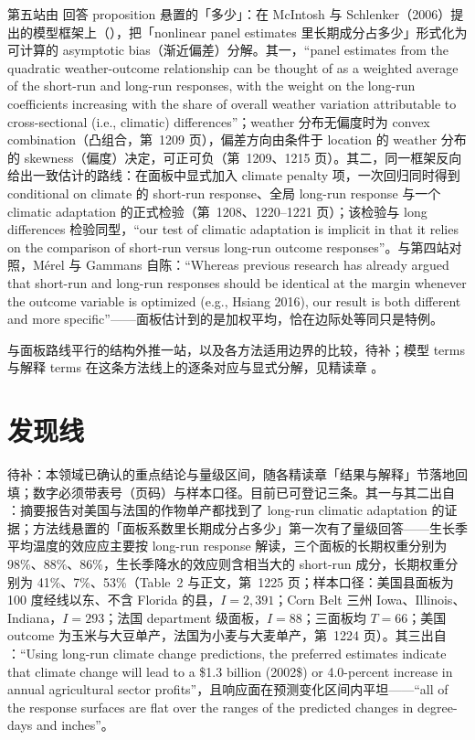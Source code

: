 第五站由  回答 proposition 悬置的「多少」：在 McIntosh 与 Schlenker（2006）提出的模型框架上（\citealp{mcintosh2006identifying}），把「nonlinear panel estimates 里长期成分占多少」形式化为可计算的 asymptotic bias（渐近偏差）分解。其一，``panel estimates from the quadratic weather-outcome relationship can be thought of as a weighted average of the short-run and long-run responses, with the weight on the long-run coefficients increasing with the share of overall weather variation attributable to cross-sectional (i.e., climatic) differences''\citep[第~1209 页]{merel2021climate}；weather 分布无偏度时为 convex combination（凸组合，第~1209 页），偏差方向由条件于 location 的 weather 分布的 skewness（偏度）决定，可正可负（第~1209、1215 页）。其二，同一框架反向给出一致估计的路线：在面板中显式加入 climate penalty 项，一次回归同时得到 conditional on climate 的 short-run response、全局 long-run response 与一个 climatic adaptation 的正式检验（第~1208、1220--1221 页）；该检验与 long differences 检验同型，``our test of climatic adaptation is implicit in that it relies on the comparison of short-run versus long-run outcome responses''\citep[第~1208 页]{merel2021climate}。与第四站对照，Mérel 与 Gammans 自陈：``Whereas previous research has already argued that short-run and long-run responses should be identical at the margin whenever the outcome variable is optimized (e.g., Hsiang 2016), our result is both different and more specific''\citep[第~1217 页]{merel2021climate}——面板估计到的是加权平均，恰在边际处等同只是特例。

与面板路线平行的结构外推一站，以及各方法适用边界的比较，待补；模型 terms 与解释 terms 在这条方法线上的逐条对应与显式分解，见精读章 。

\section{发现线}

待补：本领域已确认的重点结论与量级区间，随各精读章「结果与解释」节落地回填；数字必须带表号（页码）与样本口径。目前已可登记三条。其一与其二出自 ：摘要报告对美国与法国的作物单产都找到了 long-run climatic adaptation 的证据；方法线悬置的「面板系数里长期成分占多少」第一次有了量级回答——生长季平均温度的效应应主要按 long-run response 解读，三个面板的长期权重分别为 98\%、88\%、86\%，生长季降水的效应则含相当大的 short-run 成分，长期权重分别为 41\%、7\%、53\%（Table~2 与正文，第~1225 页；样本口径：美国县面板为 100 度经线以东、不含 Florida 的县，$I=2{,}391$；Corn Belt 三州 Iowa、Illinois、Indiana，$I=293$；法国 department 级面板，$I=88$；三面板均 $T=66$；美国 outcome 为玉米与大豆单产，法国为小麦与大麦单产，第~1224 页）。其三出自 ：``Using long-run climate change predictions, the preferred estimates indicate that climate change will lead to a \$1.3 billion (2002\$) or 4.0-percent increase in annual agricultural sector profits''\citep[第~356 页，AER 97(1) 已刊版口径]{deschenes2007economic}，且响应面在预测变化区间内平坦——``all of the response surfaces are flat over the ranges of the predicted changes in degree-days and inches''\citep[第~355 页]{deschenes2007economic}。

